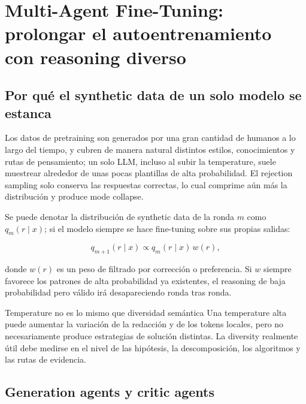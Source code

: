 \section{Multi-Agent Fine-Tuning: prolongar el autoentrenamiento con reasoning diverso}

\subsection{Por qué el synthetic data de un solo modelo se estanca}



Los datos de pretraining son generados por una gran cantidad de humanos a lo largo del tiempo, y cubren de manera natural distintos estilos, conocimientos y rutas de pensamiento; un solo LLM, incluso al subir la temperature, suele muestrear alrededor de unas pocas plantillas de alta probabilidad. El rejection sampling solo conserva las respuestas correctas, lo cual comprime aún más la distribución y produce mode collapse.

Se puede denotar la distribución de synthetic data de la ronda $m$ como $q_m(r\mid x)$; si el modelo siempre se hace fine-tuning sobre sus propias salidas:

$$
q_{m+1}(r\mid x)\propto q_m(r\mid x)\,w(r),
$$

donde $w(r)$ es un peso de filtrado por corrección o preferencia. Si $w$ siempre favorece los patrones de alta probabilidad ya existentes, el reasoning de baja probabilidad pero válido irá desapareciendo ronda tras ronda.

\begin{warningbox}{Temperature no es lo mismo que diversidad semántica}
Una temperature alta puede aumentar la variación de la redacción y de los tokens locales, pero no necesariamente produce estrategias de solución distintas. La diversity realmente útil debe medirse en el nivel de las hipótesis, la descomposición, los algoritmos y las rutas de evidencia.
\end{warningbox}

\subsection{Generation agents y critic agents}

